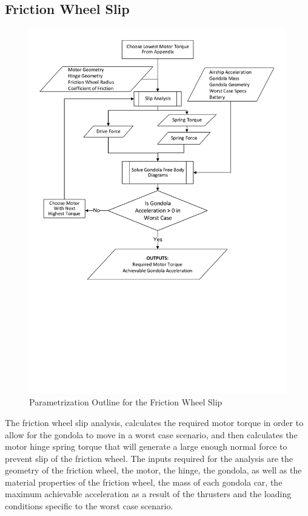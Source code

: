 \documentclass[../main.tex]{subfiles}
\begin{document}
\subsection{Friction Wheel Slip} \label{frictionSlip}
\pagebreak
\begin{figure}[H]
	\centering
	\includegraphics[width=.8\linewidth]{img/paramaterization/frictionWheelSlip.pdf}
	\caption{Parametrization Outline for the Friction Wheel Slip}
	\label{fig:frictionWheelParametrization}
\end{figure}

The friction wheel slip analysis, calculates the required motor torque in order to allow for the gondola to move in a worst case scenario, and then calculates the motor hinge spring torque that will generate a large enough normal force to prevent slip of the friction wheel. The inputs required for the analysis are the geometry of the friction wheel, the motor, the hinge, the gondola, as well as the material properties of the friction wheel, the mass of each gondola car, the maximum achievable acceleration as a result of the thrusters and the loading conditions specific to the worst case scenario. \\
\end{document}
